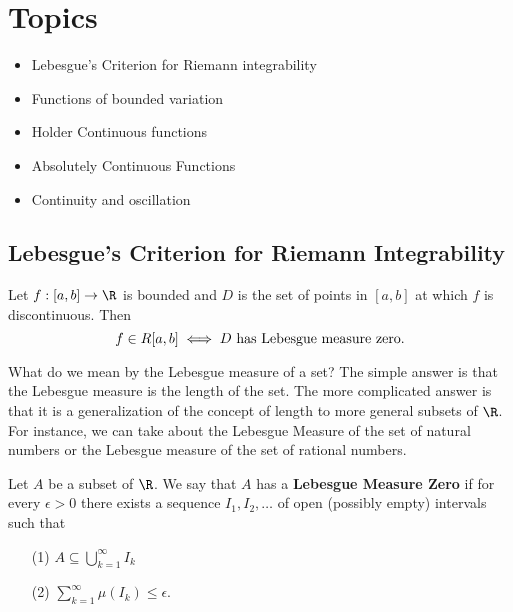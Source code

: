 \section{Topics}
\begin{itemize}
    \item Lebesgue's Criterion for Riemann integrability
    \item Functions of bounded variation
    \item Holder Continuous functions
    \item Absolutely Continuous Functions
    \item Continuity and oscillation
\end{itemize}

\subsection{Lebesgue's Criterion for Riemann Integrability}

\begin{theorem}
    Let \( f: [a,b] \to \R   \) is bounded and \( D  \) is the set of points in \( [a,b] \) at which \( f  \) is discontinuous. Then 
    \[  f \in R[a,b] \iff \text{\( D  \) has Lebesgue measure zero}. \]
\end{theorem}

What do we mean by the Lebesgue measure of a set? The simple answer is that the Lebesgue measure is the length of the set. The more complicated answer is that it is a generalization of the concept of length to more general subsets of \( \R  \). For instance, we can take about the Lebesgue Measure of the set of natural numbers or the Lebesgue measure of the set of rational numbers. 

\begin{definition}
    Let \( A  \) be a subset of \( \R  \). We say that \( A  \) has a \textbf{Lebesgue Measure Zero} if for every \( \epsilon > 0  \) there exists a sequence \( {I}_{1}, {I}_{2}, \dots  \) of open (possibly empty) intervals such that  
    \begin{enumerate}
        \item[(1)] \( A \subseteq  \bigcup_{ k = 1  }^{ \infty  }  {I}_{k } \)
        \item[(2)] \( \displaystyle \sum_{ k=1  }^{ \infty  } \mu({I}_{k}) \leq \epsilon \).
    \end{enumerate}
\end{definition}

